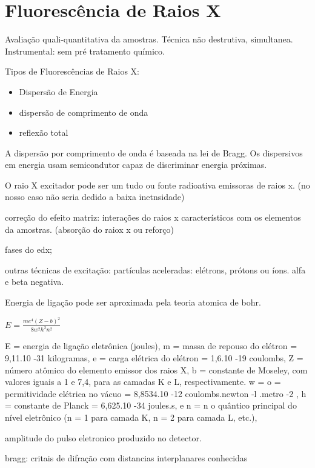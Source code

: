 \section{Fluorescência de Raios X}

Avaliação quali-quantitativa da amostras. Técnica não destrutiva, simultanea. 
Instrumental: sem pré tratamento químico. 

Tipos de Fluorescências de Raios X:

\begin{itemize}
  \item Dispersão de Energia
  \item dispersão de comprimento de onda
  \item reflexão total
\end{itemize}

A dispersão por comprimento de onda é baseada na lei de Bragg. Os dispersivos em energia usam semicondutor capaz de discriminar energia próximas. 

O raio X excitador pode ser um tudo ou fonte radioativa emissoras de raios x. (no nosso caso não seria dedido a baixa inetnsidade)

correção do efeito matriz: interações do raios x característicos com os elementos da amostras. (absorção do raiox x ou reforço)

fases do edx;

outras técnicas de excitação: partículas aceleradas: elétrons, prótons ou íons. alfa e beta negativa.

Energia de ligação pode ser aproximada pela teoria atomica de bohr.

\begin{math}
E = \frac{me^4(Z-b)^2}{8w^2h^2n^2}
\end{math}

E = energia de ligação eletrônica (joules),
m = massa de repouso do elétron = 9,11.10 -31 kilogramas,
e = carga elétrica do elétron = 1,6.10 -19 coulombs,
Z = número atômico do elemento emissor dos raios X,
b = constante de Moseley, com valores iguais a 1 e 7,4, para as camadas K e L,
respectivamente.
w = o = permitividade elétrica no vácuo = 8,8534.10 -12 coulombs.newton -l .metro -2 ,
h = constante de Planck = 6,625.10 -34 joules.s, e
n = n o quântico principal do nível eletrônico (n = 1 para camada K, n = 2 para
camada L, etc.),

amplitude do pulso eletronico produzido no detector.

bragg: critais de difração com distancias interplanares conhecidas 

